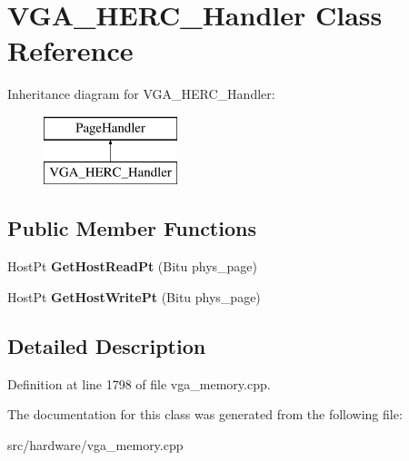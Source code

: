 \hypertarget{classVGA__HERC__Handler}{\section{V\-G\-A\-\_\-\-H\-E\-R\-C\-\_\-\-Handler Class Reference}
\label{classVGA__HERC__Handler}
}
Inheritance diagram for V\-G\-A\-\_\-\-H\-E\-R\-C\-\_\-\-Handler\-:\begin{figure}[H]
\begin{center}
\leavevmode
\includegraphics[height=2.000000cm]{classVGA__HERC__Handler}
\end{center}
\end{figure}
\subsection*{Public Member Functions}
\begin{DoxyCompactItemize}
\item 
\hypertarget{classVGA__HERC__Handler_ae520d92ecc21ac737cfc8039316e6e5c}{Host\-Pt {\bfseries Get\-Host\-Read\-Pt} (Bitu phys\-\_\-page)}\label{classVGA__HERC__Handler_ae520d92ecc21ac737cfc8039316e6e5c}

\item 
\hypertarget{classVGA__HERC__Handler_a25f8f05f6c70a3170445cf0ae346718e}{Host\-Pt {\bfseries Get\-Host\-Write\-Pt} (Bitu phys\-\_\-page)}\label{classVGA__HERC__Handler_a25f8f05f6c70a3170445cf0ae346718e}

\end{DoxyCompactItemize}


\subsection{Detailed Description}


Definition at line 1798 of file vga\-\_\-memory.\-cpp.



The documentation for this class was generated from the following file\-:\begin{DoxyCompactItemize}
\item 
src/hardware/vga\-\_\-memory.\-cpp\end{DoxyCompactItemize}
